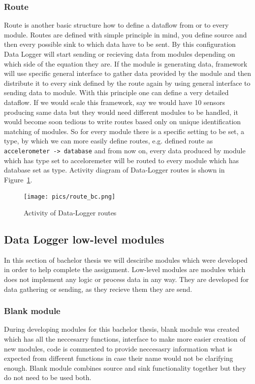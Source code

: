 \subsubsection{Route} %
\label{ssub:route}
Route is another basic structure how to define a dataflow from or to every module. Routes are defined with simple principle in mind, you define source and then every possible sink to which data have to be sent. By this configuration Data Logger will start sending or recieving data from modules depending on which side of the equation they are. If the module is generating data, framework will use specific general interface to gather data provided by the module and then distribute it to every sink defined by the route again by using general interface to sending data to module. With this principle one can define a very detailed dataflow. If we would scale this framework, say we would have 10 sensors producing same data but they would need different modules to be handled, it would become soon tedious to write routes based only on unique identification matching of modules. So for every module there is a specific setting to be set, a type, by which we can more easily define routes, e.g. defined route as \verb|accelerometer -> database| and from now on, every data produced by module which has type set to acceloremeter will be routed to every module which has database set as type. Activity diagram of Data-Logger routes is shown in Figure~\ref{fig:act}. 
\begin{figure}[H]
\begin{center}
\captionsetup{font=small}
\texttt{[image: pics/route\_bc.png]}
\caption{Activity of Data-Logger routes}
\label{fig:act}
\end{center}
\end{figure}
\label{sub:data_logger_framework}
\subsection{Data Logger low-level modules}

In this section of bachelor thesis we will desciribe modules which were developed in order to help complete the assignment. Low-level modules are modules which does not implement any logic or process data in any way. They are developed for data gathering or sending, as they recieve them they are send.
\subsubsection{Blank module} %
\label{ssub:blank_module}
During developing modules for this bachelor thesis, blank module was created which has all the neccesarry functions, interface to make more easier creation of new modules, code is commented to provide neccesasry information what is expected from different functions in case their name would not be clarifying enough. Blank module combines source and sink functionality together but they do not need to be used both.
